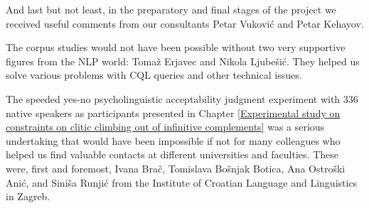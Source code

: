 And last but not least, in the preparatory and final stages of the project we received useful comments from our consultants Petar Vuković and Petar Kehayov. 

The corpus studies would not have been possible without two very supportive figures from the NLP world: Tomaž Erjavec and Nikola Ljubešić. They helped us solve various problems with CQL queries and other technical issues. 

The speeded yes-no psycholinguistic acceptability judgment experiment with 336 native speakers as participants presented in Chapter \ref{Experimental study on constraints on clitic climbing out of infinitive complements} was a serious undertaking that would have been impossible if not for many colleagues who helped us find valuable contacts at different universities and faculties. These were, first and foremost, Ivana Brač, Tomislava Bošnjak Botica, Ana Ostroški Anić, and Siniša Runjić from the Institute of Croatian Language and Linguistics in Zagreb. 

